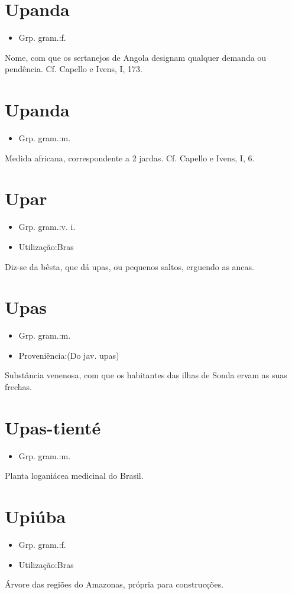 \documentclass{article}
\begin{document}
\section{Upanda}
\begin{itemize}
\item {Grp. gram.:f.}
\end{itemize}
Nome, com que os sertanejos de Angola designam qualquer demanda ou pendência. Cf. Capello e Ivens, I, 173.
\section{Upanda}
\begin{itemize}
\item {Grp. gram.:m.}
\end{itemize}
Medida africana, correspondente a 2 jardas. Cf. Capello e Ivens, I, 6.
\section{Upar}
\begin{itemize}
\item {Grp. gram.:v. i.}
\end{itemize}
\begin{itemize}
\item {Utilização:Bras}
\end{itemize}
Diz-se da bêsta, que dá upas, ou pequenos saltos, erguendo as ancas.
\section{Upas}
\begin{itemize}
\item {Grp. gram.:m.}
\end{itemize}
\begin{itemize}
\item {Proveniência:(Do jav. \textunderscore upas\textunderscore )}
\end{itemize}
Substância venenosa, com que os habitantes das ilhas de Sonda ervam as suas frechas.
\section{Upas-tienté}
\begin{itemize}
\item {Grp. gram.:m.}
\end{itemize}
Planta loganiácea medicinal do Brasil.
\section{Upiúba}
\begin{itemize}
\item {Grp. gram.:f.}
\end{itemize}
\begin{itemize}
\item {Utilização:Bras}
\end{itemize}
Árvore das regiões do Amazonas, própria para construcções.
\end{document}
